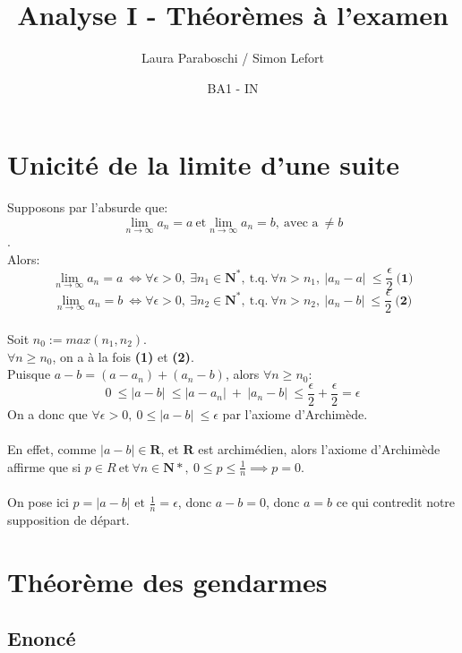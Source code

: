 \documentclass{article}
\title{Analyse I - Théorèmes à l'examen}
\author{Laura Paraboschi / Simon Lefort }
\date{BA1 - IN}
\begin{document}
\maketitle

\section{Unicité de la limite d'une suite}

Supposons par l'absurde que:
\[ \lim_{n\to\infty}a_n = a\ \text{et} \lim_{n\to\infty}a_n = b,\ \text{avec a}\ \neq b \].\\
Alors:
\[ \lim_{n\to\infty}a_n = a\ \Leftrightarrow \forall \epsilon > 0,\ \exists n_1 \in \mathbf{N^*},\ \text{t.q.}\ \forall n > n_1,\ \lvert a_n - a \lvert\ \leq \frac{\epsilon}{2}\ \textbf{(1)}\]
\[ \lim_{n\to\infty}a_n = b\ \Leftrightarrow \forall \epsilon > 0,\ \exists n_2 \in \mathbf{N^*},\ \text{t.q.}\ \forall n > n_2,\ \lvert a_n - b \lvert\ \leq \frac{\epsilon}{2}\ \textbf{(2)}\]\\
Soit $ n_0 := max(n_1, n_2) $.\\
$ \forall n \geq n_0 $, on a à la fois \textbf{(1)} et \textbf{(2)}.\\
Puisque $ a - b = (a - a_n) + (a_n - b) $, alors $ \forall n \geq n_0 $:\\
\[ 0\ \leq \lvert a - b \lvert\ \leq \lvert a - a_n \lvert\ +\ \lvert a_n - b \lvert\ \leq \frac{\epsilon}{2} + \frac{\epsilon}{2} = \epsilon \]
On a donc que $ \forall \epsilon > 0,\ 0 \leq \lvert a - b \lvert\ \leq \epsilon $ par l'axiome d'Archimède.\\\\
En effet, comme $ |a-b| \in \mathbf{R} $, et $ \mathbf{R} $ est archimédien, alors l'axiome d'Archimède affirme que si $ p \in R\ \text{et}\ \forall n \in \mathbf{N*},\ 0 \leq p \leq \frac{1}{n} \implies p = 0 $. \\\\
On pose ici $ p = |a - b| \text{ et } \frac{1}{n} = \epsilon $, donc $ a - b = 0 $, donc $ a = b $ ce qui contredit notre supposition de départ.

\newpage

\section{Théorème des gendarmes}

\subsection{Enoncé}
\end{document}
